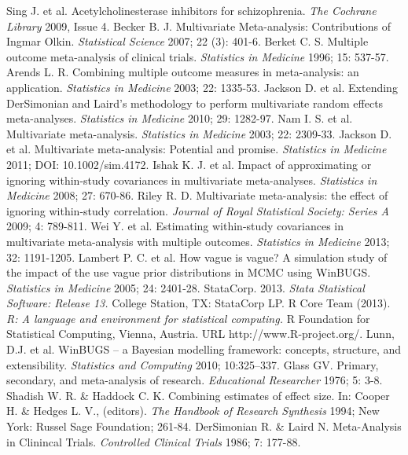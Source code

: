 \documentclass[a4paper,openright,12pt]{report}
\begin{document}
\begin{thebibliography}{99}
 Sing J. et al. Acetylcholinesterase inhibitors for schizophrenia. \textit{The Cochrane Library} 2009, Issue 4.
 Becker B. J. Multivariate Meta-analysis: Contributions of Ingmar Olkin. \textit{Statistical Science} 2007; 22 (3): 401-6.
 Berket C. S. Multiple outcome meta-analysis of clinical trials. \textit{Statistics in Medicine} 1996; 15: 537-57.
 Arends L. R. Combining multiple outcome measures in meta-analysis: an application. \textit{Statistics in Medicine} 2003; 22: 1335-53.
 Jackson D. et al. Extending DerSimonian and Laird's methodology to perform multivariate random effects meta-analyses. \textit{Statistics in Medicine} 2010; 29: 1282-97.
 Nam I. S. et al. Multivariate meta-analysis. \textit{Statistics in Medicine} 2003; 22: 2309-33.
 Jackson D. et al. Multivariate meta-analysis: Potential and promise. \textit{Statistics in Medicine} 2011; DOI: 10.1002/sim.4172.
 Ishak K. J. et al. Impact of approximating or ignoring within-study covariances in multivariate meta-analyses. \textit{Statistics in Medicine} 2008; 27: 670-86.
 Riley R. D. Multivariate meta-analysis: the effect of ignoring within-study correlation. \textit{Journal of Royal Statistical Society: Series A} 2009; 4: 789-811.
 Wei Y. et al. Estimating within-study covariances in multivariate meta-analysis with multiple outcomes. \textit{Statistics in Medicine} 2013; 32: 1191-1205. 
 Lambert P. C. et al. How vague is vague? A simulation study of the impact of the use vague prior distributions in MCMC using WinBUGS. \textit{Statistics in Medicine} 2005; 24: 2401-28.
 StataCorp. 2013. \textit{Stata Statistical Software: Release 13.} College Station, TX: StataCorp LP.
 R Core Team (2013). \textit{R: A language and environment for statistical computing.} R Foundation for Statistical Computing, Vienna, Austria. URL http://www.R-project.org/.
 Lunn, D.J. et al. WinBUGS -- a Bayesian modelling framework: concepts, structure, and extensibility. \textit{Statistics and Computing} 2010; 10:325--337.
 Glass GV. Primary, secondary, and meta-analysis of research. \textit{Educational Researcher} 1976; 5: 3-8.
 Shadish W. R. \& Haddock C. K. Combining estimates of effect size. In: Cooper H. \& Hedges L. V., (editors). \textit{The Handbook of Research Synthesis} 1994; New York: Russel Sage Foundation; 261-84.
 DerSimonian R. \& Laird N. Meta-Analysis in Clinincal Trials. \textit{Controlled Clinical Trials} 1986; 7: 177-88.

\end{thebibliography}
\end{document}
